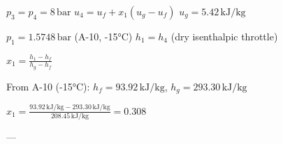 \( p_3 = p_4 = 8 \, \text{bar} \)  
\( u_4 = u_f + x_1 (u_g - u_f) \)  
\( u_g = 5.42 \, \text{kJ/kg} \)  

\( p_1 = 1.5748 \, \text{bar} \) (A-10, -15°C)  
\( h_1 = h_4 \) (dry isenthalpic throttle)  

\( x_1 = \frac{h_1 - h_f}{h_g - h_f} \)  

From A-10 (-15°C):  
\( h_f = 93.92 \, \text{kJ/kg} \), \( h_g = 293.30 \, \text{kJ/kg} \)  

\( x_1 = \frac{93.92 \, \text{kJ/kg} - 293.30 \, \text{kJ/kg}}{208.45 \, \text{kJ/kg}} = 0.308 \)

---